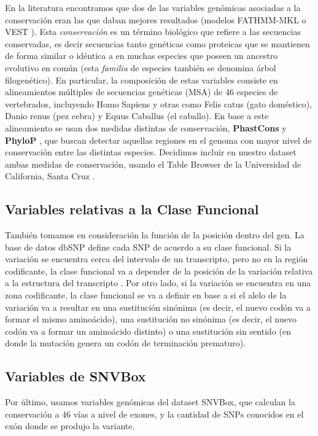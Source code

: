 En la literatura encontramos que dos de las variables genómicas asociadas a la conservación eran las que daban mejores resultados (modelos FATHMM-MKL \cite{Shihab2015} o VEST \cite{Carter2013}). Esta \textit{conservación} es un término biológico que refiere a las secuencias conservadas, es decir secuencias tanto genéticas como proteicas que se mantienen de forma similar o idéntica a en muchas especies que poseen un ancestro evolutivo en común (esta \textit{familia} de especies también se denomina árbol filogenético). En particular, la composición de estas variables consiste en alineamientos múltiples de secuencias genéticas (MSA) de 46 especies de vertebrados, incluyendo Homo Sapiens y otras como Felis catus (gato doméstico), Danio renus (pez cebra) y Equus Caballus (el caballo). En base a este alineamiento se usan dos medidas distintas de conservación, \textbf{PhastCons} \cite{siepel2005evolutionarily} y \textbf{PhyloP} \cite{Pollard2010}, que buscan detectar aquellas regiones en el genoma con mayor nivel de conservación entre las distintas especies. Decidimos incluir en nuestro dataset ambas medidas de conservación, usando el Table Browser de la Universidad de California, Santa Cruz \cite{Karolchik2004}.

\subsection{Variables relativas a la Clase Funcional}

También tomamos en consideración la función de la posición dentro del gen. La base de datos dbSNP define cada SNP de acuerdo a su clase funcional. Si la variación se encuentra cerca del intervalo de un transcripto, pero no en la región codificante, la clase funcional va a depender de la posición de la variación relativa a la estructura del transcripto \cite{Ostell2007}. Por otro lado, si la variación se encuentra en una zona codificante, la clase funcional se va a definir en base a si el alelo de la variación va a resultar en una sustitución sinónima (es decir, el nuevo codón va a formar el mismo aminoácido), una sustitución no sinónima (es decir, el nuevo codón va a formar un aminoácido distinto) o una sustitución sin sentido (en donde la mutación genera un codón de terminación prematuro).

\subsection{Variables de SNVBox}

Por último, usamos variables genómicas del dataset SNVBox, que calculan la conservación a 46 vías a nivel de exones, y la cantidad de SNPs conocidos en el exón donde se produjo la variante. 

